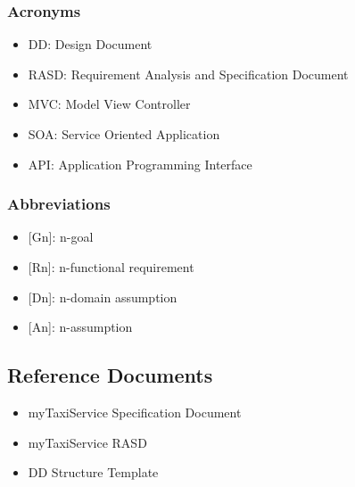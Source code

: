 \subsubsection{Acronyms}
\begin{itemize}
	\item DD: Design Document
	\item RASD: Requirement Analysis and Specification Document
	\item MVC: Model View Controller
	\item SOA: Service Oriented Application
	\item API: Application Programming Interface
\end{itemize}
\subsubsection{Abbreviations}
\begin{itemize}
\item {[}Gn{]}: n-goal 
\item {[}Rn{]}: n-functional requirement
\item {[}Dn{]}: n-domain assumption
\item {[}An{]}: n-assumption
\end{itemize}
\subsection{Reference Documents}
\begin{itemize}
	\item myTaxiService Specification Document
	\item myTaxiService RASD
	\item DD Structure Template
\end{itemize}
